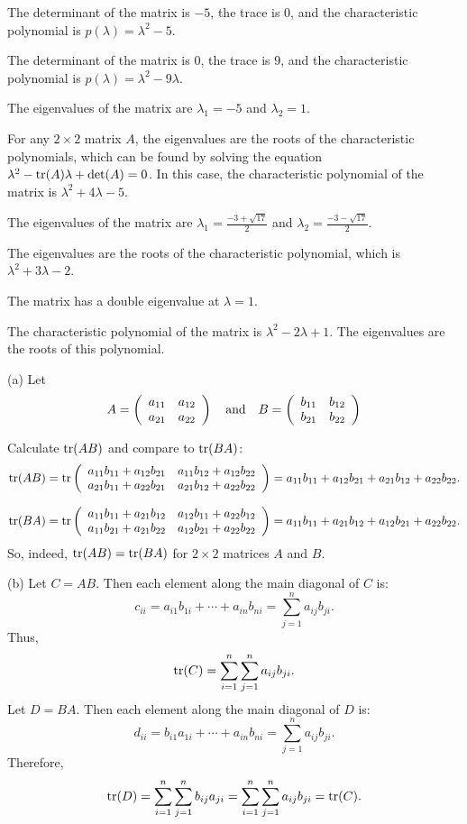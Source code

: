  The determinant of the matrix is $-5$, the trace is $0$, and
the characteristic polynomial is $p(\lambda)=\lambda^2-5$.

 The determinant of the matrix is $0$, the trace is $9$, and
the characteristic polynomial is $p(\lambda)=\lambda^2-9\lambda$.

 \ans The eigenvalues of the matrix are $\lambda_1 = -5$ and
$\lambda_2 = 1$.

\soln For any $2 \times 2$ matrix $A$, the eigenvalues are the roots
of the characteristic polynomials, which can be found by solving the
equation $\lambda^2 - {\rm tr}(A)\lambda + \det(A) = 0$.  In this case, the
characteristic polynomial of the matrix is $\lambda^2 + 4\lambda - 5$.

 \ans The eigenvalues of the matrix are
$\lambda_1 = \frac{-3 + \sqrt{17}}{2}$ and $\lambda_2 =
\frac{-3 - \sqrt{17}}{2}$.

\soln The eigenvalues are the roots of the characteristic polynomial, which
is $\lambda^2 + 3\lambda - 2$.

 \ans The matrix has a double eigenvalue at $\lambda = 1$.

\soln The characteristic polynomial of the matrix is $\lambda^2 - 2\lambda
+ 1$.  The eigenvalues are the roots of this polynomial.

(a) Let
\[
A = \left(\begin{array}{rr} a_{11} & a_{12}\\ a_{21} &a_{22}\end{array}\right) \quad\mbox{and}\quad
B = \left(\begin{array}{rr} b_{11} & b_{12}\\ b_{21} &b_{22}\end{array}\right)
\]

Calculate ${\rm tr}(AB)$ and compare to ${\rm tr}(BA)$:
\[
{\rm tr}(AB) =
{\rm tr}\left(\begin{array}{rr} a_{11}b_{11} + a_{12}b_{21} & a_{11}b_{12} + a_{12}b_{22}\\ a_{21}b_{11} + a_{22}b_{21} &a_{21}b_{12} + a_{22}b_{22}\end{array}\right) =
a_{11}b_{11} + a_{12}b_{21} + a_{21}b_{12} + a_{22}b_{22}.
\]

\[
{\rm tr}(BA) =
{\rm tr}\left(\begin{array}{rr} a_{11}b_{11} + a_{21}b_{12} & a_{12}b_{11} + a_{22}b_{12}\\ a_{11}b_{21} + a_{21}b_{22} &a_{12}b_{21} + a_{22}b_{22}\end{array}\right) =
a_{11}b_{11} + a_{21}b_{12} + a_{12}b_{21} + a_{22}b_{22}.
\]
So, indeed, ${\rm tr}(AB) = {\rm tr}(BA)$ for $2 \times 2$ matrices
$A$ and $B$.

(b) Let $C = AB$.  Then each element along the main diagonal of $C$ is:
\[
c_{ii} = a_{i1}b_{1i} + \cdots + a_{in}b_{ni} =
\sum_{j = 1}^{n} a_{ij}b_{ji}.
\]
Thus,
\[
{\rm tr}(C) = \sum_{i = 1}^{n} \sum_{j = 1}^{n} a_{ij}b_{ji}.
\]
Let $D = BA$.  Then each element along the main diagonal of $D$ is:
\[
d_{ii} = b_{i1}a_{1i} + \cdots + a_{in}b_{ni} =
\sum_{j = 1}^n a_{ij}b_{ji}.
\]
Therefore,
\[
{\rm tr}(D) = \sum_{i = 1}^{n} \sum_{j = 1}^{n} b_{ij}a_{ji}
= \sum_{i = 1}^{n} \sum_{j = 1}^{n} a_{ij}b_{ji} = {\rm tr}(C).
\]

